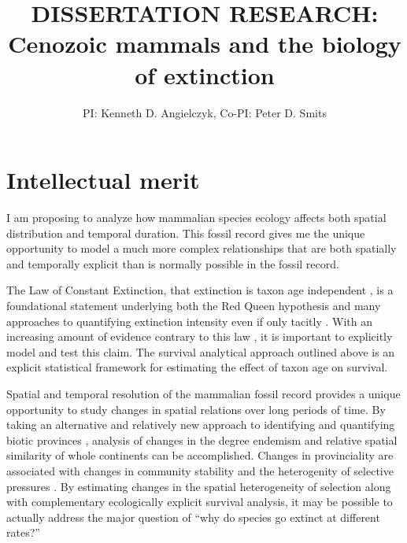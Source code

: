 \documentclass[11pt,letterpaper]{article}
\title{\uppercase{Dissertation Research:}\\ Cenozoic mammals and the biology of extinction}
\author{PI: Kenneth D. Angielczyk, Co-PI: Peter D. Smits}
\date{}
\begin{document}
\linenumbers
\modulolinenumbers[2]

\setcounter{secnumdepth}{0}

\maketitle

\section{Intellectual merit}
I am proposing to analyze how mammalian species ecology affects both spatial distribution and temporal duration. This fossil record gives me the unique opportunity to model a much more complex relationships that are both spatially and temporally explicit than is normally possible in the fossil record. 

The Law of Constant Extinction, that extinction is taxon age independent \citep{VanValen1973}, is a foundational statement underlying both the Red Queen hypothesis and many approaches to quantifying extinction intensity even if only tacitly \citep{Alroy2014a,Foote1996e,Foote1997c,Foote2000,Raup1975,Sepkoski1975}. With an increasing amount of evidence contrary to this law \citep{Drake2014,Raup1975,Sepkoski1975,Finnegan2008}, it is important to explicitly model and test this claim. The survival analytical approach outlined above is an explicit statistical framework for estimating the effect of taxon age on survival.

Spatial and temporal resolution of the mammalian fossil record provides a unique opportunity to study changes in spatial relations over long periods of time. By taking an alternative and relatively new approach to identifying and quantifying biotic provinces \citep{Sidor2013,Vilhena2013b,Vilhena2013}, analysis of changes in the degree endemism and relative spatial similarity of whole continents can be accomplished. Changes in provinciality are associated with changes in community stability and the heterogenity of selective pressures \citep{Sidor2013,Vilhena2013}. By estimating changes in the spatial heterogeneity of selection along with complementary ecologically explicit survival analysis, it may be possible to actually address the major question of ``why do species go extinct at different rates?''
\end{document}
